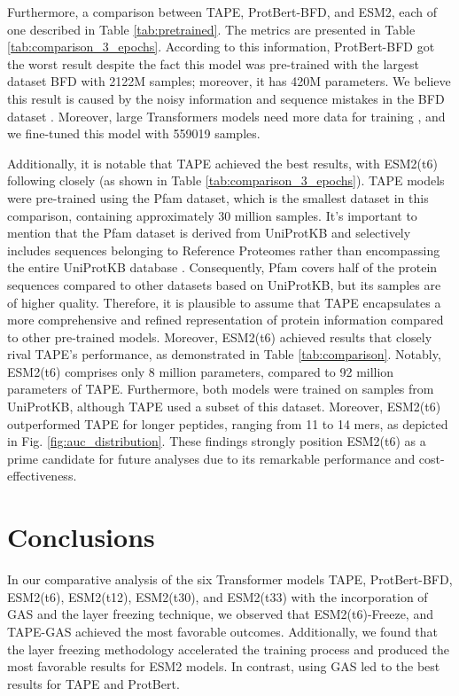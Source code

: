 Furthermore, a comparison between TAPE, ProtBert-BFD, and ESM2, each of one described in Table \ref{tab:pretrained}. The metrics are presented in Table \ref{tab:comparison_3_epochs}. According to this information, ProtBert-BFD got the worst result despite the fact this model was pre-trained with the largest dataset BFD with 2122M samples; moreover, it has 420M parameters. We believe this result is caused by the noisy information and sequence mistakes in the BFD dataset \cite{elnaggar2021prottrans}. Moreover, large Transformers models need more data for training \cite{elnaggar2021prottrans}, and we fine-tuned this model with 559019 samples.

Additionally, it is notable that TAPE achieved the best results, with ESM2(t6) following closely (as shown in Table \ref{tab:comparison_3_epochs}). TAPE models were pre-trained using the Pfam dataset, which is the smallest dataset in this comparison, containing approximately 30 million samples. It's important to mention that the Pfam dataset is derived from UniProtKB and selectively includes sequences belonging to Reference Proteomes rather than encompassing the entire UniProtKB database \cite{finn2016pfam}. Consequently, Pfam covers half of the protein sequences compared to other datasets based on UniProtKB, but its samples are of higher quality. Therefore, it is plausible to assume that TAPE encapsulates a more comprehensive and refined representation of protein information compared to other pre-trained models. Moreover, ESM2(t6) achieved results that closely rival TAPE's performance, as demonstrated in Table \ref{tab:comparison}. Notably, ESM2(t6) comprises only 8 million parameters, compared to 92 million parameters of TAPE. Furthermore, both models were trained on samples from UniProtKB, although TAPE used a subset of this dataset. Moreover, ESM2(t6) outperformed TAPE for longer peptides, ranging from 11 to 14 mers, as depicted in Fig. \ref{fig:auc_distribution}. These findings strongly position ESM2(t6) as a prime candidate for future analyses due to its remarkable performance and cost-effectiveness.


\section{Conclusions}

In our comparative analysis of the six Transformer models TAPE, ProtBert-BFD, ESM2(t6), ESM2(t12), ESM2(t30), and ESM2(t33) with the incorporation of GAS and the layer freezing technique, we observed that ESM2(t6)-Freeze, and TAPE-GAS achieved the most favorable outcomes. Additionally, we found that the layer freezing methodology accelerated the training process and produced the most favorable results for ESM2 models. In contrast, using GAS led to the best results for TAPE and ProtBert.

